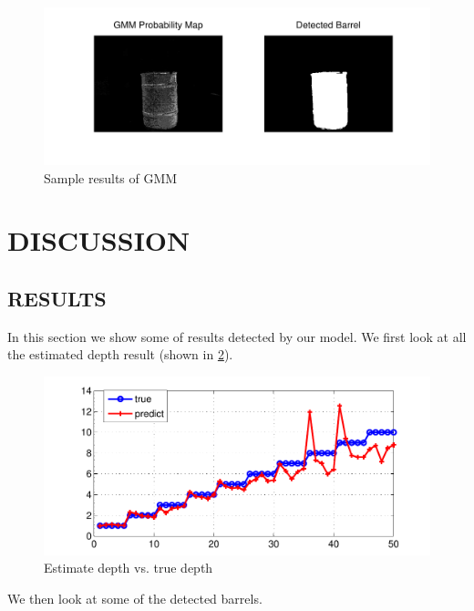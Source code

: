 \documentclass[twoside]{article}
\begin{document}
\begin{multicols}{2}
\begin{figure}[H]
  \centering
  \includegraphics[width=\columnwidth]{gmm.pdf}
    \caption{Sample results of GMM}
    \label{fig:gmm}
\end{figure}


\section{DISCUSSION}

\subsection{RESULTS}
In this section we show some of results detected by our model. We first look at all the estimated depth result (shown in \ref{fig:depth}).

\begin{figure}[H]
  \centering
  \includegraphics[width=\columnwidth]{result.pdf}
    \caption{Estimate depth vs. true depth}
    \label{fig:depth}
\end{figure}

We then look at some of the detected barrels.


\end{multicols}
\end{document}

